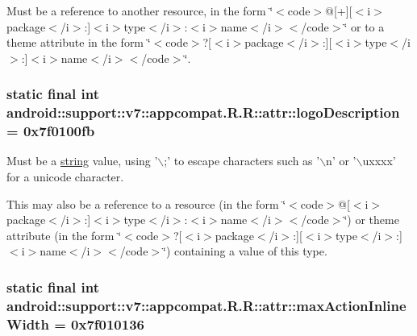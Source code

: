 Must be a reference to another resource, in the form \char`\"{}$<$code$>$@\mbox{[}+\mbox{]}\mbox{[}$<$i$>$package$<$/i$>$:\mbox{]}$<$i$>$type$<$/i$>$:$<$i$>$name$<$/i$>$$<$/code$>$\char`\"{} or to a theme attribute in the form \char`\"{}$<$code$>$?\mbox{[}$<$i$>$package$<$/i$>$:\mbox{]}\mbox{[}$<$i$>$type$<$/i$>$:\mbox{]}$<$i$>$name$<$/i$>$$<$/code$>$\char`\"{}. \hypertarget{classandroid_1_1support_1_1v7_1_1appcompat_1_1_r_1_1attr_34af6ae6c8a4f86e26a00b98fc71be0a}{
\subsubsection[{logoDescription}]{\setlength{\rightskip}{0pt plus 5cm}static final int android::support::v7::appcompat.R.R::attr::logoDescription = 0x7f0100fb}}
\label{classandroid_1_1support_1_1v7_1_1appcompat_1_1_r_1_1attr_34af6ae6c8a4f86e26a00b98fc71be0a}


Must be a \hyperlink{classandroid_1_1support_1_1v7_1_1appcompat_1_1_r_1_1string}{string} value, using '$\backslash$;' to escape characters such as '$\backslash$n' or '$\backslash$uxxxx' for a unicode character. 

This may also be a reference to a resource (in the form \char`\"{}$<$code$>$@\mbox{[}$<$i$>$package$<$/i$>$:\mbox{]}$<$i$>$type$<$/i$>$:$<$i$>$name$<$/i$>$$<$/code$>$\char`\"{}) or theme attribute (in the form \char`\"{}$<$code$>$?\mbox{[}$<$i$>$package$<$/i$>$:\mbox{]}\mbox{[}$<$i$>$type$<$/i$>$:\mbox{]}$<$i$>$name$<$/i$>$$<$/code$>$\char`\"{}) containing a value of this type. \hypertarget{classandroid_1_1support_1_1v7_1_1appcompat_1_1_r_1_1attr_af98f2cffb1ca16e7e91e47c9f914c60}{
\subsubsection[{maxActionInlineWidth}]{\setlength{\rightskip}{0pt plus 5cm}static final int android::support::v7::appcompat.R.R::attr::maxActionInlineWidth = 0x7f010136}}
\label{classandroid_1_1support_1_1v7_1_1appcompat_1_1_r_1_1attr_af98f2cffb1ca16e7e91e47c9f914c60}


